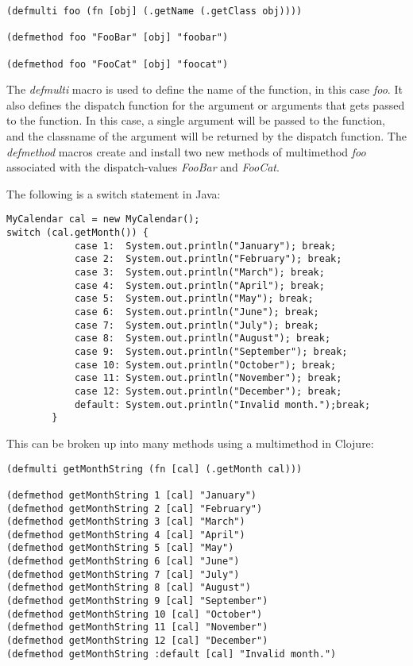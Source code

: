 \lstset{language=Clojure}
\begin{lstlisting}
(defmulti foo (fn [obj] (.getName (.getClass obj))))

(defmethod foo "FooBar" [obj] "foobar")

(defmethod foo "FooCat" [obj] "foocat")
\end{lstlisting}

The {\it defmulti} macro is used to define the name of the function, in this
case {\it foo}. It also defines the dispatch function for the argument
or arguments that gets passed to the function. In this case, a single
argument will be passed to the function, and the classname of the
argument will be returned by the dispatch function.
The {\it defmethod} macros create and install two new methods of
multimethod {\it foo} associated with the dispatch-values {\it FooBar}
and {\it FooCat}. 

The following is a switch statement in Java:
\lstset{language=Java}
\begin{lstlisting}
MyCalendar cal = new MyCalendar();
switch (cal.getMonth()) {
            case 1:  System.out.println("January"); break;
            case 2:  System.out.println("February"); break;
            case 3:  System.out.println("March"); break;
            case 4:  System.out.println("April"); break;
            case 5:  System.out.println("May"); break;
            case 6:  System.out.println("June"); break;
            case 7:  System.out.println("July"); break;
            case 8:  System.out.println("August"); break;
            case 9:  System.out.println("September"); break;
            case 10: System.out.println("October"); break;
            case 11: System.out.println("November"); break;
            case 12: System.out.println("December"); break;
            default: System.out.println("Invalid month.");break;
        }
\end{lstlisting}

This can be broken up into many methods using a multimethod in Clojure:

\lstset{language=Clojure}
\begin{lstlisting}
(defmulti getMonthString (fn [cal] (.getMonth cal)))

(defmethod getMonthString 1 [cal] "January")
(defmethod getMonthString 2 [cal] "February")
(defmethod getMonthString 3 [cal] "March")
(defmethod getMonthString 4 [cal] "April")
(defmethod getMonthString 5 [cal] "May")
(defmethod getMonthString 6 [cal] "June")
(defmethod getMonthString 7 [cal] "July")
(defmethod getMonthString 8 [cal] "August")
(defmethod getMonthString 9 [cal] "September")
(defmethod getMonthString 10 [cal] "October")
(defmethod getMonthString 11 [cal] "November")
(defmethod getMonthString 12 [cal] "December")
(defmethod getMonthString :default [cal] "Invalid month.")
\end{lstlisting}

